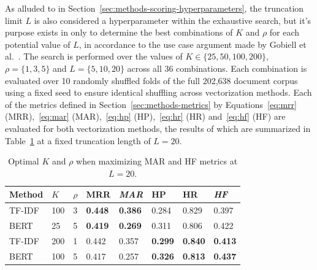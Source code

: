 \documentclass[11pt]{article}
\theoremstyle{plain}
\theoremstyle{definition}
\begin{document}
As alluded to in Section~\ref{sec:methods-scoring-hyperparameters}, the truncation limit $L$ is also considered a hyperparameter within the exhaustive search, but it's purpose exists in only to determine the best combinations of $K$ and $\rho$ for each potential value of $L$, in accordance to the use case argument made by Gobiell et al.~\cite{gobeill/2013/managing}. The search is performed over the values of $K \in \{ 25, 50, 100, 200 \}$, $\rho=\{1,3,5\}$ and $L=\{5,10,20\}$ across all 36 combinations. Each combination is evaluated over 10 randomly shuffled folds of the full 202,638 document corpus using a fixed seed to ensure identical shuffling across vectorization methods. Each of the metrics defined in Section~\ref{sec:methods-metrics} by Equations~\ref{eq:mrr} (MRR),~\ref{eq:mar} (MAR),~\ref{eq:hp} (HP),~\ref{eq:hr} (HR) and~\ref{eq:hf} (HF) are evaluated for both vectorization methods, the results of which are summarized in Table~\ref{tab:both_optimal_sel} at a fixed truncation length of $L=20$.
\begin{table}
    \centering
    \begin{tabular}{| m{4em} | m{2em} | m{2em} | m{3em} | m{3em} | m{3em} | m{3em} | m{3em} |}
        \hline
        Method & $K$ & $\rho$ & MRR            & \textit{MAR}   & HP             & HR             & \textit{HF}    \\
        \hline
        \hline
        TF-IDF & 100 & 3      & \textbf{0.448} & \textbf{0.386} & 0.284          & 0.829          & 0.397          \\
        \hline
        BERT   & 25  & 5      & \textbf{0.419} & \textbf{0.269} & 0.311          & 0.806          & 0.422          \\
        \hline
        \hline
        TF-IDF & 200 & 1      & 0.442          & 0.357          & \textbf{0.299} & \textbf{0.840} & \textbf{0.413} \\
        \hline
        BERT   & 100 & 5      & 0.417          & 0.257          & \textbf{0.326} & \textbf{0.813} & \textbf{0.437} \\
        \hline
    \end{tabular}
    \caption{Optimal $K$ and $\rho$ when maximizing MAR and HF metrics at $L=20$.}\label{tab:both_optimal_sel}
\end{table}
\end{document}
